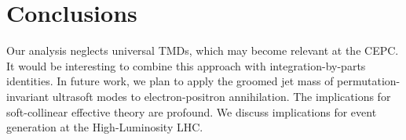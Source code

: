 \section{Conclusions}\label{sec:conclusions}

Our analysis neglects universal TMDs, which may become relevant at the
CEPC. It would be interesting to combine this approach with
integration-by-parts identities. In future work, we plan to apply the
groomed jet mass of permutation-invariant ultrasoft modes to
electron-positron annihilation. The implications for soft-collinear
effective theory are profound. We discuss implications for event
generation at the High-Luminosity LHC.

